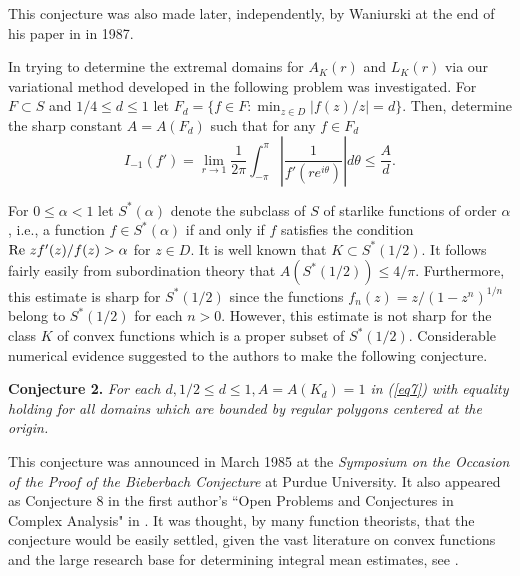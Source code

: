 \documentclass[final]{siamltex}
\begin{document}
\vspace{0.1in}


This conjecture was also made later, independently, by Waniurski at the end of his paper in \cite{Waniurski1} in 1987.

In trying to determine the extremal domains for $A_K(r)$ and $L_K(r)$ via our variational method developed in \cite{BarnardLewis1} the
following problem was investigated.  For $F \subset S$ and $1/4 \leq d \leq 1$ let $F_d = \{ f \in F : \min_{z \in D} |f(z)/z| = d \}$.  Then,
determine the sharp constant $A = A(F_d)$ such that for any $f \in F_d$
\begin{equation}
I_{-1}(f') = \lim_{r \rightarrow 1} \frac{1}{2\pi} \int_{-\pi}^{\pi} \left | \frac{1}{f'(re^{i \theta})} \right | d \theta  \leq \frac{A}{d}. \label{eq7}
\end{equation}

For $0 \leq \alpha < 1$ let $S^*(\alpha)$ denote the subclass of $S$ of starlike functions of order $\alpha$, i.e., a function $f \in S^*(\alpha)$
if and only if $f$ satisfies the condition ${\rm Re} \  z f'(z)/f(z) > \alpha$ for $z \in D$.  It is well known that $K \subset S^*(1/2)$.
It follows fairly easily from subordination theory that $A(S^*(1/2)) \leq 4/\pi$.  Furthermore, this estimate is sharp for $S^*(1/2)$ since the
functions $f_n(z) = z/(1-z^n)^{1/n}$ belong to $S^*(1/2)$ for each $n > 0$.  However, this estimate is not sharp for the class $K$ of convex functions 
which is a proper subset of $S^*(1/2)$.  Considerable numerical evidence suggested to the authors to make the following
conjecture.

\vspace{0.1in}

{\bf Conjecture 2.} {\em For each $d, 1/2 \leq d \leq 1, A = A({K}_d) = 1$ in (\ref{eq7}) with equality holding
for all domains which are bounded by regular polygons centered at the origin.}

\vspace{0.1in}

This conjecture was announced in March 1985 at the {\em Symposium on the Occasion of the 
Proof of the Bieberbach Conjecture} at Purdue University.  It also appeared as Conjecture 8 in the first author's ``Open Problems and Conjectures in 
Complex Analysis" in \cite{Barnard1}.  
It was thought, by many function theorists, that the conjecture would be
easily settled, given the vast literature on convex functions and the
large research base for determining integral mean estimates, see
\cite{Duren1}.
\end{document}
